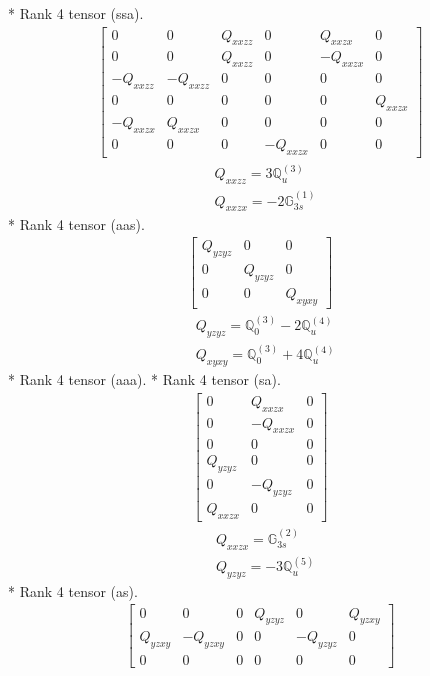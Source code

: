 \documentclass[fleqn,8pt,landscape]{jsarticle}
\begin{document}
* Rank 4 tensor (ssa).
\begin{align*}
\begin{bmatrix} 0 & 0 & Q_{xxzz} & 0 & Q_{xxzx} & 0 \\ 0 & 0 & Q_{xxzz} & 0 & - Q_{xxzx} & 0 \\ - Q_{xxzz} & - Q_{xxzz} & 0 & 0 & 0 & 0 \\ 0 & 0 & 0 & 0 & 0 & Q_{xxzx} \\ - Q_{xxzx} & Q_{xxzx} & 0 & 0 & 0 & 0 \\ 0 & 0 & 0 & - Q_{xxzx} & 0 & 0 \end{bmatrix}
\end{align*}
\begin{align*}
& Q_{xxzz} = 3 \mathbb{Q}_{u}^{(3)} \\
& Q_{xxzx} = - 2 \mathbb{G}_{3s}^{(1)}
\end{align*}
* Rank 4 tensor (aas).
\begin{align*}
\begin{bmatrix} Q_{yzyz} & 0 & 0 \\ 0 & Q_{yzyz} & 0 \\ 0 & 0 & Q_{xyxy} \end{bmatrix}
\end{align*}
\begin{align*}
& Q_{yzyz} = \mathbb{Q}_{0}^{(3)} - 2 \mathbb{Q}_{u}^{(4)} \\
& Q_{xyxy} = \mathbb{Q}_{0}^{(3)} + 4 \mathbb{Q}_{u}^{(4)}
\end{align*}
* Rank 4 tensor (aaa).
* Rank 4 tensor (sa).
\begin{align*}
\begin{bmatrix} 0 & Q_{xxzx} & 0 \\ 0 & - Q_{xxzx} & 0 \\ 0 & 0 & 0 \\ Q_{yzyz} & 0 & 0 \\ 0 & - Q_{yzyz} & 0 \\ Q_{xxzx} & 0 & 0 \end{bmatrix}
\end{align*}
\begin{align*}
& Q_{xxzx} = \mathbb{G}_{3s}^{(2)} \\
& Q_{yzyz} = - 3 \mathbb{Q}_{u}^{(5)}
\end{align*}
* Rank 4 tensor (as).
\begin{align*}
\begin{bmatrix} 0 & 0 & 0 & Q_{yzyz} & 0 & Q_{yzxy} \\ Q_{yzxy} & - Q_{yzxy} & 0 & 0 & - Q_{yzyz} & 0 \\ 0 & 0 & 0 & 0 & 0 & 0 \end{bmatrix}
\end{align*}
\end{document}
